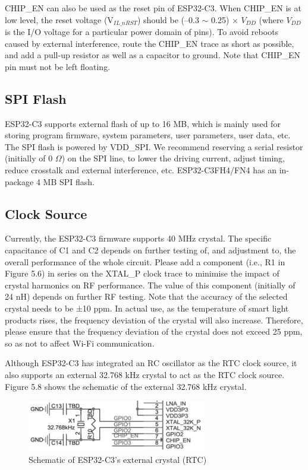 \documentclass[a4paper,12pt,openany]{book}
\begin{document}
CHIP\_EN can also be used as the reset pin of ESP32-C3. When CHIP\_EN is at low level, the reset voltage (V$_{IL\_nRST}$) should be (--0.3 $\sim$ 0.25) × $V_{DD}$ (where $V_{DD}$ is the I/O voltage for a particular power domain of pins). To avoid reboots caused by external interference, route the CHIP\_EN trace as short as possible, and add a pull-up resistor as well as a capacitor to ground. Note that CHIP\_EN pin must not be left floating.

\subsection{SPI Flash}
ESP32-C3 supports external flash of up to 16 MB, which is mainly used for storing program firmware, system parameters, user parameters, user data, etc. The SPI flash is powered by VDD\_SPI. We recommend reserving a serial resistor (initially of 0 $\Omega$) on the SPI line, to lower the driving current, adjust timing, reduce crosstalk and external interference, etc. ESP32-C3FH4/FN4 has an in-package 4 MB SPI flash.

\subsection{Clock Source}
Currently, the ESP32-C3 firmware supports 40 MHz crystal. The specific capacitance of C1 and C2 depends on further testing of, and adjustment to, the overall performance of the whole circuit. Please add a component (i.e., R1 in Figure 5.6) in series on the XTAL\_P clock trace to minimise the impact of crystal harmonics on RF performance. The value of this component (initially of 24 nH) depends on further RF testing. Note that the accuracy of the selected crystal needs to be ±10 ppm. In actual use, as the temperature of smart light products rises, the frequency deviation of the crystal will also increase. Therefore, please ensure that the frequency deviation of the crystal does not exceed 25 ppm, so as not to affect Wi-Fi communication.

Although ESP32-C3 has integrated an RC oscillator as the RTC clock source, it also supports an external 32.768 kHz crystal to act as the RTC clock source. Figure 5.8 shows the schematic of the external 32.768 kHz crystal.

\begin{figure}[h!]
    \centering
    \includegraphics[width=0.7\textwidth]{D5Z/5-8}
    \caption{Schematic of ESP32-C3’s external crystal (RTC)}
\end{figure}
\end{document}
